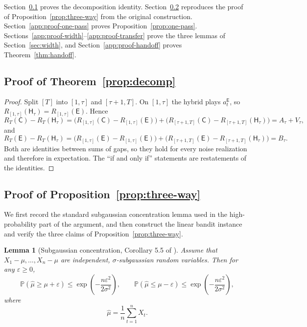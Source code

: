 \documentclass{article}
\newtheorem{lemma}{Lemma}
\theoremstyle{definition}
\theoremstyle{remark}
\theoremstyle{remark}
\newcommand{\Cold}{\mathsf{C}}
\newcommand{\Exp}{\mathsf{E}}
\newcommand{\Hyb}{\mathsf{H}}
\begin{document}
Section~\ref{app:proof-decomp} proves the decomposition identity.
Section~\ref{app:proof-three-way} reproduces the proof of
Proposition~\ref{prop:three-way} from the original construction.
Section~\ref{app:proof-one-pass} proves Proposition~\ref{prop:one-pass}.
Sections~\ref{app:proof-width}--\ref{app:proof-transfer} prove the three
lemmas of Section~\ref{sec:width}, and Section~\ref{app:proof-handoff}
proves Theorem~\ref{thm:handoff}.

\subsection{Proof of Theorem~\ref{prop:decomp}}
\label{app:proof-decomp}

\begin{proof}
Split $[T]$ into $[1,\tau]$ and $[\tau+1,T]$. On $[1,\tau]$ the hybrid plays
$a_t^{\Exp}$, so $R_{[1,\tau]}(\Hyb_\tau)=R_{[1,\tau]}(\Exp)$. Hence
\[
R_T(\Cold)-R_T(\Hyb_\tau)
=\bigl(R_{[1,\tau]}(\Cold)-R_{[1,\tau]}(\Exp)\bigr)
+\bigl(R_{[\tau+1,T]}(\Cold)-R_{[\tau+1,T]}(\Hyb_\tau)\bigr)
=A_\tau+V_\tau ,
\]
and
\[
R_T(\Exp)-R_T(\Hyb_\tau)
=\bigl(R_{[1,\tau]}(\Exp)-R_{[1,\tau]}(\Exp)\bigr)
+\bigl(R_{[\tau+1,T]}(\Exp)-R_{[\tau+1,T]}(\Hyb_\tau)\bigr)
=B_\tau .
\]
Both are identities between sums of gaps, so they hold for every noise
realization and therefore in expectation. The ``if and only if'' statements
are restatements of the identities.
\end{proof}

\subsection{Proof of Proposition~\ref{prop:three-way}}
\label{app:proof-three-way}

We first record the standard subgaussian concentration lemma used in the
high-probability part of the argument, and then construct the linear bandit
instance and verify the three claims of Proposition~\ref{prop:three-way}.

\begin{lemma}[Subgaussian concentration, Corollary 5.5 of \cite{lattimore2020bandit}]
\label{lem:subgaussian}
Assume that $X_1-\mu,\dots,X_n-\mu$ are independent, $\sigma$-subgaussian random variables. Then for any $\varepsilon \ge 0$,
\[
\mathbb{P}\!\left(\hat{\mu} \ge \mu+\varepsilon\right)
\le
\exp\!\left(-\frac{n\varepsilon^2}{2\sigma^2}\right),
\qquad
\mathbb{P}\!\left(\hat{\mu} \le \mu-\varepsilon\right)
\le
\exp\!\left(-\frac{n\varepsilon^2}{2\sigma^2}\right),
\]
where
\[
\hat{\mu}=\frac{1}{n}\sum_{t=1}^n X_t.
\]
\end{lemma}
\end{document}

